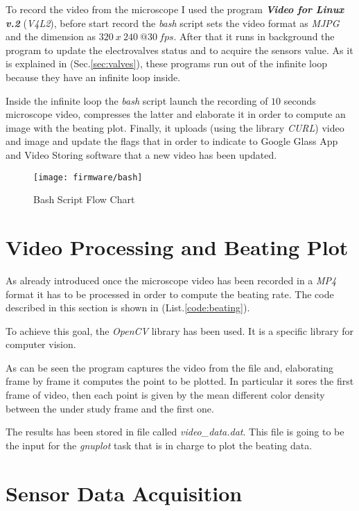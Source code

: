To record the video from the microscope I used the program \textit{\textbf{Video for Linux v.2}} (\textit{V4L2}), before start record the \textit{bash} script sets the video format as \textit{MJPG} and the dimension as $320\ x\ 240\ @ 30\ fps$. After that it runs in background the program to update the electrovalves status and to acquire the sensors value. As it is explained in (Sec.\ref{sec:valves}), these programs run out of the infinite loop because they have an infinite loop inside.

Inside the infinite loop the \textit{bash} script launch the recording of $10$ seconds microscope video, compresses the latter and elaborate it in order to compute an image with the beating plot. Finally, it uploads (using the library \textit{CURL}) video and image and update the flags that in order to indicate to Google Glass App and Video Storing software that a new video has been updated.

\begin{figure}[h]
	\centering
	\texttt{[image: firmware/bash]}
	\caption{Bash Script Flow Chart}
	\label{Fig:bash}
	
\end{figure}
\clearpage

\section{Video Processing and Beating Plot}

As already introduced once the microscope video has been recorded in a \textit{MP4} format it has to be processed in order to compute the beating rate. The code described in this section is shown in (List.\ref{code:beating}). 

To achieve this goal, the \textit{OpenCV} library has been used. It is a specific library for computer vision.

As can be seen the program captures the video from the file and, elaborating frame by frame it computes the point to be plotted. In particular it sores the first frame of video, then each point is given by the mean different color density between the under study frame and the first one.

The results has been stored in file called \textit{video\_data.dat}. This file is going to be the input for the \textit{gnuplot} task that is in charge to plot the beating data.

\section{Sensor Data Acquisition}

